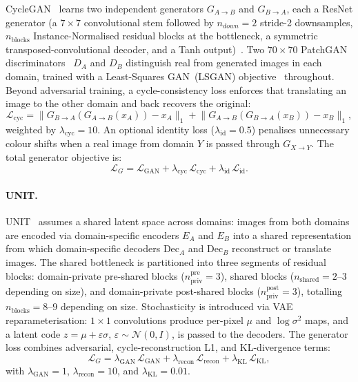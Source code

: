 CycleGAN~\cite{zhu2017unpaired} learns two independent generators $G_{A \to B}$ and
$G_{B \to A}$, each a ResNet generator (a $7{\times}7$ convolutional stem followed by
$n_{down}{=}2$ stride-2 downsamples, $n_{\text{blocks}}$ Instance-Normalised residual
blocks at the bottleneck, a symmetric transposed-convolutional decoder, and a Tanh
output)~\cite{zhu2017unpaired}.
Two $70{\times}70$ PatchGAN discriminators~\cite{isola2017image} $D_A$ and $D_B$
distinguish real from generated images in each domain, trained with a Least-Squares
GAN~(LSGAN) objective~\cite{mao2017lsgan} throughout.
Beyond adversarial training, a cycle-consistency loss enforces that translating an image
to the other domain and back recovers the original:
\begin{equation}
  \mathcal{L}_{\text{cyc}} =
    \bigl\| G_{B \to A}(G_{A \to B}(x_A)) - x_A \bigr\|_1 +
    \bigl\| G_{A \to B}(G_{B \to A}(x_B)) - x_B \bigr\|_1,
\end{equation}
weighted by $\lambda_{\text{cyc}}{=}10$.
An optional identity loss ($\lambda_{\text{id}}{=}0.5$) penalises unnecessary colour
shifts when a real image from domain $Y$ is passed through $G_{X \to Y}$.
The total generator objective is:
\begin{equation}
  \mathcal{L}_G = \mathcal{L}_{\text{GAN}} +
    \lambda_{\text{cyc}}\,\mathcal{L}_{\text{cyc}} +
    \lambda_{\text{id}}\,\mathcal{L}_{\text{id}}.
\end{equation}

\paragraph{UNIT.}
\label{sec:supp-unit}

UNIT~\cite{liu2017unsupervised} assumes a shared latent space across domains: images
from both domains are encoded via domain-specific encoders $E_A$ and $E_B$ into a
shared representation from which domain-specific decoders $\text{Dec}_A$ and
$\text{Dec}_B$ reconstruct or translate images.
The shared bottleneck is partitioned into three segments of residual blocks:
domain-private pre-shared blocks ($n_{\text{priv}}^{\text{pre}}{=}3$), shared blocks
($n_{\text{shared}}{=}2$--$3$ depending on size), and domain-private post-shared blocks
($n_{\text{priv}}^{\text{post}}{=}3$), totalling $n_{\text{blocks}}{=}8$--$9$
depending on size.
Stochasticity is introduced via VAE reparameterisation:
$1{\times}1$ convolutions produce per-pixel $\mu$ and $\log\sigma^2$ maps, and a latent
code $z = \mu + \varepsilon\sigma$, $\varepsilon \sim \mathcal{N}(0,I)$, is passed to the
decoders.
The generator loss combines adversarial, cycle-reconstruction L1, and KL-divergence
terms:
\begin{equation}
  \mathcal{L}_G = \lambda_{\text{GAN}}\,\mathcal{L}_{\text{GAN}} +
    \lambda_{\text{recon}}\,\mathcal{L}_{\text{recon}} +
    \lambda_{\text{KL}}\,\mathcal{L}_{\text{KL}},
\end{equation}
with $\lambda_{\text{GAN}}{=}1$, $\lambda_{\text{recon}}{=}10$, and
$\lambda_{\text{KL}}{=}0.01$.

